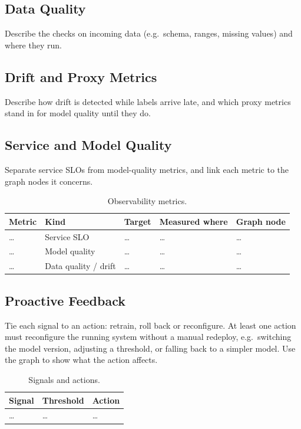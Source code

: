 \documentclass[report]{itvest}
\begin{document}
\subsection{Data Quality}

Describe the checks on incoming data (e.g.\ schema, ranges, missing
values) and where they run.

\subsection{Drift and Proxy Metrics}

Describe how drift is detected while labels arrive late, and which proxy
metrics stand in for model quality until they do.

\subsection{Service and Model Quality}

Separate service SLOs from model-quality metrics, and link each metric to
the graph nodes it concerns.

\begin{table}[h]
  \centering
  \begin{tabularx}{\textwidth}{XllXX}
    \toprule
    Metric & Kind & Target & Measured where & Graph node \\
    \midrule
    \ldots & Service SLO & \ldots & \ldots & \ldots \\
    \ldots & Model quality & \ldots & \ldots & \ldots \\
    \ldots & Data quality / drift & \ldots & \ldots & \ldots \\
    \bottomrule
  \end{tabularx}
  \caption{Observability metrics.}
  \label{tab:metrics}
\end{table}

\subsection{Proactive Feedback}

Tie each signal to an action: retrain, roll back or reconfigure. At least
one action must reconfigure the running system without a manual redeploy,
e.g.\ switching the model version, adjusting a threshold, or falling back
to a simpler model. Use the graph to show what the action affects.

\begin{table}[h]
  \centering
  \begin{tabularx}{\textwidth}{XXX}
    \toprule
    Signal & Threshold & Action \\
    \midrule
    \ldots & \ldots & \ldots \\
    \bottomrule
  \end{tabularx}
  \caption{Signals and actions.}
  \label{tab:feedback}
\end{table}
\end{document}
